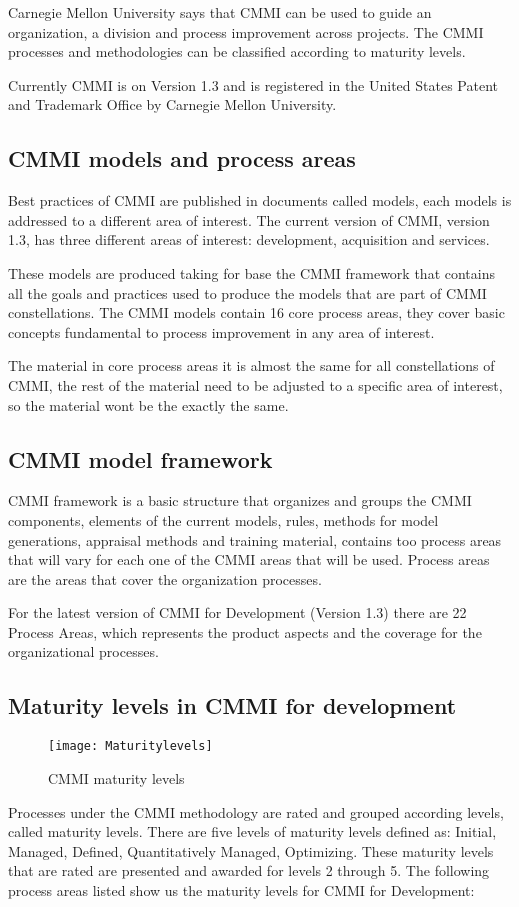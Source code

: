 Carnegie Mellon University says that CMMI can be used to guide an organization, a division and process improvement across projects. The CMMI processes and methodologies can be classified according to maturity levels.

Currently CMMI is on Version 1.3 and is registered in the United States Patent and Trademark Office by Carnegie Mellon University.

\subsection{CMMI models and process areas}
Best practices of CMMI are published in documents called models, each models is addressed to a different area of interest. The current version of CMMI, version 1.3, has three different areas of interest: development, acquisition and services.

These models are produced taking for base the CMMI framework that contains all the goals and practices used to produce the models that are part of CMMI constellations. The CMMI models contain 16 core process areas, they cover basic concepts fundamental to process improvement in any area of interest. 

The material in core process areas it is almost the same for all constellations of CMMI, the rest of the material need to be adjusted to a specific area of interest, so the material wont be the exactly the same.

\subsection{CMMI model framework}
CMMI framework is a basic structure that organizes and groups the CMMI components, elements of the current models, rules, methods for model generations, appraisal methods and training material, contains too process areas that will vary for each one of the CMMI areas that will be used. Process areas are the areas that cover the organization processes.

For the latest version of CMMI for Development (Version 1.3) there are 22 Process Areas, which represents the product aspects and the coverage for the organizational processes.

\subsection{Maturity levels in CMMI for development}
\begin{figure}[h]
	\begin{center}
		\leavevmode
		\texttt{[image: Maturitylevels]}
		\caption{CMMI maturity levels}
		\label{fig:arch}
	\end{center}
\end{figure}
Processes under the CMMI methodology are rated and grouped according levels, called maturity levels. There are five levels of maturity levels defined as: Initial, Managed, Defined, Quantitatively Managed, Optimizing. These maturity levels that are rated are presented and awarded for levels 2 through 5. The following process areas listed show us the maturity levels for CMMI for Development:

